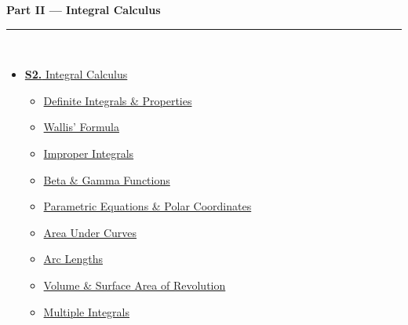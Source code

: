 \documentclass[12pt,a4paper]{article}
\begin{document}
\vspace{6pt}

\begin{tcolorbox}[breakable,colback=cB!5,colframe=cB,boxrule=1pt,arc=5pt,
  left=8pt,right=8pt,top=8pt,bottom=8pt,before skip=4pt]
  {\large\bfseries\textcolor{cB}{Part II --- Integral Calculus}}\\[5pt]
  \textcolor{cB!40}{\rule{\textwidth}{0.4pt}}\\[3pt]
  \small\begin{itemize}[leftmargin=1.2em,itemsep=1pt,label={\textcolor{cB}{$\triangleright$}}]
    \item \hyperref[sec:S2]{\textbf{S2.} Integral Calculus}
      \begin{itemize}[leftmargin=1.5em,itemsep=0pt,label={\textcolor{cB}{$\cdot$}}]
        \item \hyperref[sub:s2-definite]{Definite Integrals \& Properties}
        \item \hyperref[sub:s2-wallis]{Wallis' Formula}
        \item \hyperref[sub:s2-improper]{Improper Integrals}
        \item \hyperref[sub:s2-beta]{Beta \& Gamma Functions}
        \item \hyperref[sub:s2-param]{Parametric Equations \& Polar Coordinates}
        \item \hyperref[sub:s2-area]{Area Under Curves}
        \item \hyperref[sub:s2-arclength]{Arc Lengths}
        \item \hyperref[sub:s2-volume]{Volume \& Surface Area of Revolution}
        \item \hyperref[sub:s2-multiple]{Multiple Integrals}
      \end{itemize}
  \end{itemize}
\end{tcolorbox}

\vspace{6pt}
\end{document}
